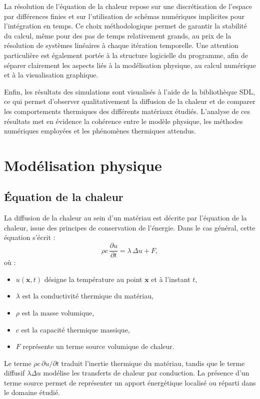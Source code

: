 \documentclass[a4paper,12pt]{article}
\begin{document}
La résolution de l’équation de la chaleur repose sur une discrétisation de l’espace par différences finies et sur l’utilisation de schémas numériques implicites pour l’intégration en temps. Ce choix méthodologique permet de garantir la stabilité du calcul, même pour des pas de temps relativement grands, au prix de la résolution de systèmes linéaires à chaque itération temporelle. Une attention particulière est également portée à la structure logicielle du programme, afin de séparer clairement les aspects liés à la modélisation physique, au calcul numérique et à la visualisation graphique.

Enfin, les résultats des simulations sont visualisés à l’aide de la bibliothèque SDL, ce qui permet d’observer qualitativement la diffusion de la chaleur et de comparer les comportements thermiques des différents matériaux étudiés. L’analyse de ces résultats met en évidence la cohérence entre le modèle physique, les méthodes numériques employées et les phénomènes thermiques attendus.

\section{Modélisation physique}

\subsection{Équation de la chaleur}

La diffusion de la chaleur au sein d’un matériau est décrite par l’équation de la chaleur, issue des principes de conservation de l’énergie. Dans le cas général, cette équation s’écrit :
\begin{equation}
\rho c \, \frac{\partial u}{\partial t}
= \lambda \, \Delta u + F,
\end{equation}
où :
\begin{itemize}
    \item $u(\mathbf{x},t)$ désigne la température au point $\mathbf{x}$ et à l’instant $t$,
    \item $\lambda$ est la conductivité thermique du matériau,
    \item $\rho$ est la masse volumique,
    \item $c$ est la capacité thermique massique,
    \item $F$ représente un terme source volumique de chaleur.
\end{itemize}

Le terme $\rho c \, \partial u / \partial t$ traduit l’inertie thermique du matériau, tandis que le terme diffusif $\lambda \Delta u$ modélise les transferts de chaleur par conduction. La présence d’un terme source permet de représenter un apport énergétique localisé ou réparti dans le domaine étudié.
\end{document}
